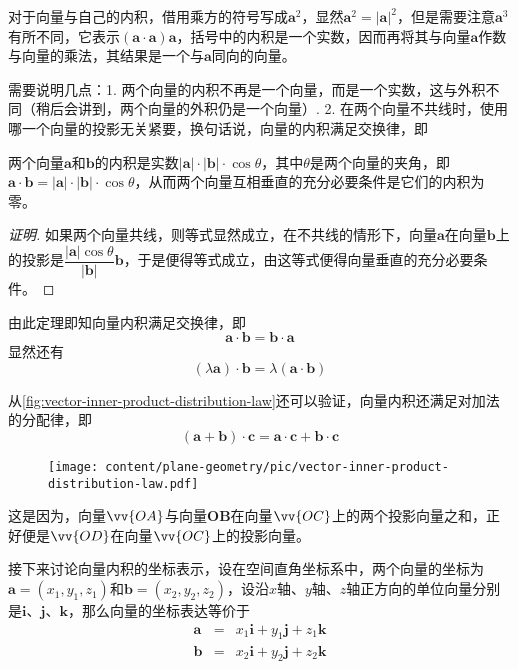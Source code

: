 对于向量与自己的内积，借用乘方的符号写成$\bm{a}^2$，显然$\bm{a}^2=|\bm{a}|^2$，但是需要注意$\bm{a}^3$有所不同，它表示$(\bm{a} \cdot \bm{a})\bm{a}$，括号中的内积是一个实数，因而再将其与向量$\bm{a}$作数与向量的乘法，其结果是一个与$\bm{a}$同向的向量。

需要说明几点：1. 两个向量的内积不再是一个向量，而是一个实数，这与外积不同（稍后会讲到，两个向量的外积仍是一个向量）. 2. 在两个向量不共线时，使用哪一个向量的投影无关紧要，换句话说，向量的内积满足交换律，即
\begin{theorem}
两个向量$\bm{a}$和$\bm{b}$的内积是实数$|\bm{a}| \cdot |\bm{b}| \cdot \cos{\theta}$，其中$\theta$是两个向量的夹角，即$\bm{a} \cdot \bm{b} = |\bm{a}| \cdot |\bm{b}| \cdot \cos{\theta}$，从而两个向量互相垂直的充分必要条件是它们的内积为零。
\end{theorem}

\begin{proof}[证明]
  如果两个向量共线，则等式显然成立，在不共线的情形下，向量$\bm{a}$在向量$\bm{b}$上的投影是$\dfrac{|\bm{a}|\cos{\theta}}{|\bm{b}|} \bm{b}$，于是便得等式成立，由这等式便得向量垂直的充分必要条件。
\end{proof}

由此定理即知向量内积满足交换律，即
\[ \bm{a} \cdot \bm{b} = \bm{b} \cdot \bm{a} \]
显然还有
\[ (\lambda \bm{a}) \cdot \bm{b} = \lambda (\bm{a} \cdot \bm{b}) \]

从\autoref{fig:vector-inner-product-distribution-law}还可以验证，向量内积还满足对加法的分配律，即
\[ (\bm{a}+\bm{b}) \cdot \bm{c} = \bm{a} \cdot \bm{c} + \bm{b} \cdot \bm{c} \] 

\begin{figure}[htbp]
\centering
\texttt{[image: content/plane-geometry/pic/vector-inner-product-distribution-law.pdf]}
\caption{}
\label{fig:vector-inner-product-distribution-law}
\end{figure}

这是因为，向量$\vv{OA}$与向量$\bm{OB}$在向量$\vv{OC}$上的两个投影向量之和，正好便是$\vv{OD}$在向量$\vv{OC}$上的投影向量。

接下来讨论向量内积的坐标表示，设在空间直角坐标系中，两个向量的坐标为$\bm{a} = (x_1,y_1,z_1)$和$\bm{b}=(x_2,y_2,z_2)$，设沿$x$轴、$y$轴、$z$轴正方向的单位向量分别是$\bm{i}$、$\bm{j}$、$\bm{k}$，那么向量的坐标表达等价于
\begin{eqnarray*}
  \bm{a} & = & x_1 \bm{i} + y_1 \bm{j} + z_1 \bm{k} \\
  \bm{b} & = & x_2 \bm{i} + y_2 \bm{j} + z_2 \bm{k}
\end{eqnarray*}

